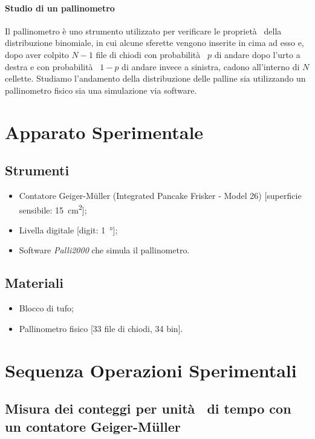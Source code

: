 \documentclass[10pt,oneside,a4paper]{article}
\begin{document}
\paragraph{Studio di un pallinometro}
Il pallinometro è uno strumento utilizzato per verificare le proprietà  della distribuzione binomiale, in cui alcune sferette vengono inserite in cima ad esso e, dopo aver colpito $N-1$ file di chiodi con probabilità  $p$ di andare dopo l'urto a destra e con probabilità  $1-p$ di andare invece a sinistra, cadono all'interno di $N$ cellette. Studiamo l'andamento della distribuzione delle palline sia utilizzando un pallinometro fisico sia una simulazione via software.


\section{Apparato Sperimentale}
	
\subsection{Strumenti}
\label{subsec:strumenti}
\begin{itemize}
\item Contatore Geiger-M\"uller (Integrated Pancake Frisker - Model 26) [superficie sensibile: \SI{15}{cm^2}];
\item Livella digitale [digit: \SI{1}{°}];
\item Software \emph{Palli2000} che simula il pallinometro.
\end{itemize}

\subsection{Materiali}
\begin{itemize}
\item Blocco di tufo;
\item Pallinometro fisico [33 file di chiodi, 34 bin].
\end{itemize}


\section{Sequenza Operazioni Sperimentali} 

\subsection{Misura dei conteggi per unità  di tempo con un contatore Geiger-M\"uller}
\end{document}
